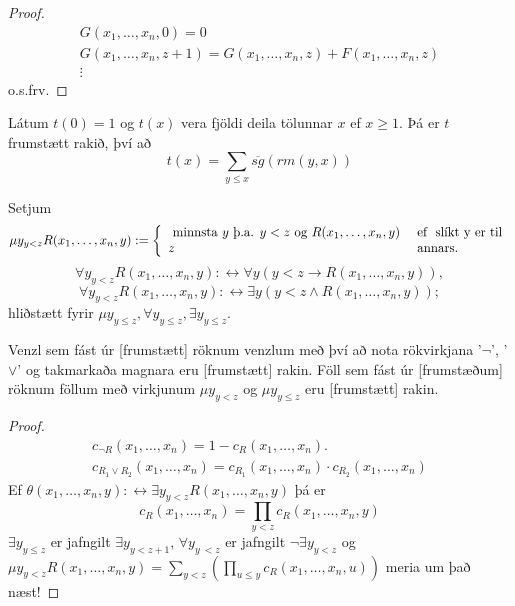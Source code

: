 \documentclass[12pt]{book}
\newcommand{\xxn}{x_1, \dotsc, x_n}
\begin{document}
\begin{proof}
  \begin{gather*}
    G(\xxn,0) = 0 \\
    G(\xxn, z+1) = G(\xxn,z) + F(\xxn,z)\\
    \vdots
  \end{gather*}
  o.s.frv.
\end{proof}


\begin{daemi}
  Látum $t(0) = 1$ og $t(x)$ vera fjöldi deila
  tölunnar $x$ ef $x \geq 1$. Þá er
  $t$ frumstætt rakið, því að
  \[t(x) = \sum_{y \leq x} \overline{sg}(rm(y,x))\]
\end{daemi}

\begin{skgr}
  Setjum
 \[\mu y_{y< z} R(\xxn,y) := \bcondef \text{ minnsta $y$ þ.a. $y < z$ og $R(\xxn,y)$} & \Ef \text{ slíkt y er til} \\ z & \text{ annars}. \econdef\]
 \[ \forall y_{y<z} R(\xxn,y): \leftrightarrow \forall y ( y < z \rightarrow R(\xxn,y)),\]
 \[ \forall y_{y<z} R(\xxn,y): \leftrightarrow \exists y ( y < z \wedge R(\xxn,y));\]
 hliðstætt fyrir $\mu y_{y \leq z}, \forall y_{y\leq z}, \exists y _{y \leq z}$.
\end{skgr}

\begin{setn}
  Venzl sem fást úr [frumstætt] röknum venzlum með því að nota rökvirkjana
  '$\lnot$', '$\vee$' og takmarkaða magnara  eru [frumstætt] rakin.
  Föll sem fást úr [frumstæðum] röknum föllum með virkjunum
  $\mu y_{y < z}$ og $\mu y_{y \leq z}$ eru [frumstætt] rakin.
\end{setn}

\begin{proof}
  \begin{gather*}
    c_{\lnot R} (\xxn) = 1 - c_R(\xxn). \\
    c_{R_1 \vee R_2} (\xxn) = c_{R_1} (\xxn) \cdot c_{R_2}(\xxn)
  \end{gather*}
  Ef $\theta(\xxn,y): \leftrightarrow \exists y_{y < z} R(\xxn,y)$ þá er
  \[ c_R(\xxn) = \prod_{y<z} c_R(\xxn, y)\]
  $\exists y_{y\leq z}$ er jafngilt $\exists y_{y <  z+1}$, $\forall y_{y\ < z}$
  er jafngilt $\lnot \exists y_{y <  z}$ og
  $\mu y_{y <  z} R(\xxn, y) = \sum_{y<z} (\prod_{u \leq y} c_R (\xxn, u))$
  meria um það næst!
\end{proof}
\end{document}
